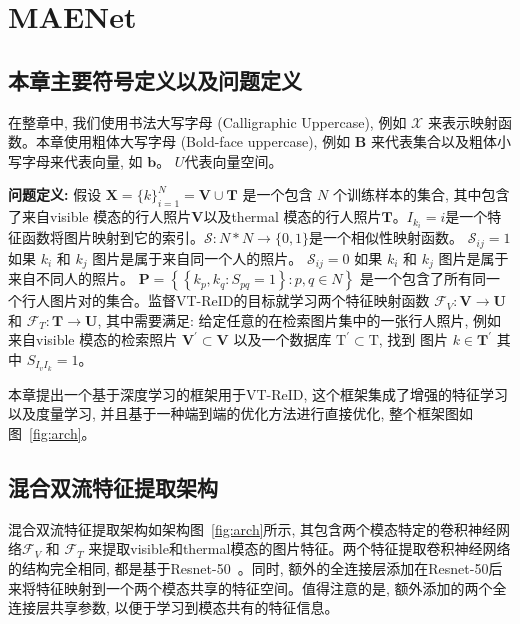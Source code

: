 \section{MAENet}
\subsection{本章主要符号定义以及问题定义}
在整章中, 我们使用书法大写字母 (Calligraphic Uppercase), 例如 $\mathcal{X}$ 来表示映射函数。本章使用粗体大写字母 (Bold-face uppercase), 例如 $\mathbf{B}$ 来代表集合以及粗体小写字母来代表向量, 如 $\mathbf{b}$。 $U$代表向量空间。 \par
\textbf{问题定义:} 假设 $\mathbf{X}=\{k\}_{i=1}^N=\mathbf{V} \cup \mathbf{T}$ 是一个包含 $N$ 个训练样本的集合, 其中包含了来自visible 模态的行人照片$\mathbf{V}$以及thermal 模态的行人照片$\mathbf{T}$。$I_{k_i} = i$是一个特征函数将图片映射到它的索引。$\mathcal{S}: N * N \rightarrow\{0,1\}$是一个相似性映射函数。 $\mathcal{S}_{ij} = 1$ 如果 $k_i$ 和 $ k_j$ 图片是属于来自同一个人的照片。  $\mathcal{S}_{ij} = 0$ 如果 $k_i$ 和 $ k_j$ 图片是属于来自不同人的照片。 $\mathbf{P}=\left\{\left\{k_p, k_q: S_{p q}=1\right\}: p, q \in N\right\}$ 是一个包含了所有同一个行人图片对的集合。监督VT-ReID的目标就学习两个特征映射函数 $\mathcal{F}_V: \mathbf{V} \rightarrow \mathbf{U}$ 和 $\mathcal{F}_T: \mathbf{T} \rightarrow \mathbf{U}$, 其中需要满足: 给定任意的在检索图片集中的一张行人照片, 例如来自visible 模态的检索照片 $\mathbf{V}^{\prime} \subset \mathbf{V}$ 以及一个数据库 $\mathrm{T}^{\prime} \subset \mathrm{T}$, 找到 图片 $k \in \mathbf{T}^{\prime}$ 其中 $S_{I_v I_k}=1$。\par
本章提出一个基于深度学习的框架用于VT-ReID, 这个框架集成了增强的特征学习以及度量学习, 并且基于一种端到端的优化方法进行直接优化, 整个框架图如图~\ref{fig:arch}。
\subsection{混合双流特征提取架构}
混合双流特征提取架构如架构图~\ref{fig:arch}所示, 其包含两个模态特定的卷积神经网络$\mathcal{F}_V$ 和 $\mathcal{F}_T$ 来提取visible和thermal模态的图片特征。两个特征提取卷积神经网络的结构完全相同, 都是基于Resnet-50~\cite{he2016deep}。同时, 额外的全连接层添加在Resnet-50后来将特征映射到一个两个模态共享的特征空间。值得注意的是, 额外添加的两个全连接层共享参数, 以便于学习到模态共有的特征信息。

